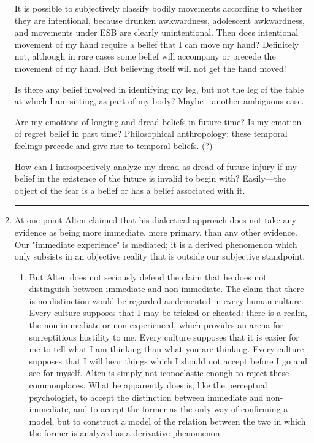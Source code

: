 \documentclass[10pt,twoside,draft]{memoir}
\newcommand{\gap}{\plainbreak{2}}
\begin{document}
\begin{enumerate}
It is possible to subjectively classify bodily movements according to 
whether they are intentional, because drunken awkwardness, adolescent 
awkwardness, and movements under ESB are clearly unintentional. Then 
does intentional movement of my hand require a belief that I can move my 
hand? Definitely not, although in rare cases some belief will accompany or 
precede the movement of my hand. But believing itself will not get the hand 
moved! 

Is there any belief involved in identifying my leg, but not the leg of the 
table at which I am sitting, as part of my body? Maybe---another ambiguous 
case.

Are my emotions of longing and dread beliefs in future time? Is my 
emotion of regret belief in past time? Philosophical anthropology: these 
temporal feelings precede and give rise to temporal beliefs. (?) 

How can I introspectively analyze my dread as dread of future injury if 
my belief in the existence of the future is invalid to begin with? Easily---the 
object of the fear is a belief or has a belief associated with it. 

\gap

\item At one point Alten claimed that his dialectical approach does not 
take any evidence as being more immediate, more primary, than any other 
evidence. Our "immediate experience" is mediated; it is a derived 
phenomenon which only subsists in an objective reality that is outside our 
subjective standpoint. 

\begin{enumerate}

\item But Alten does not seriously defend the claim that he does not 
distinguish between immediate and non-immediate. The claim that there is 
no distinction would be regarded as demented in every human culture. Every 
culture supposes that I may be tricked or cheated: there is a realm, the 
non-immediate or non-experienced, which provides an arena for surreptitious 
hostility to me. Every culture supposes that it is easier for me to tell what I 
am thinking than what you are thinking. Every culture supposes that I will 
hear things which I should not accept before I go and see for myself. Alten is 
simply not iconoclastic enough to reject these commonplaces. What he 
apparently does is, like the perceptual psychologist, to accept the distinction 
between immediate and non-immediate, and to accept the former as the only 
way of confirming a model, but to construct a model of the relation between 
the two in which the former is analyzed as a derivative phenomenon. 


\end{enumerate}
\end{enumerate}
\end{document}
